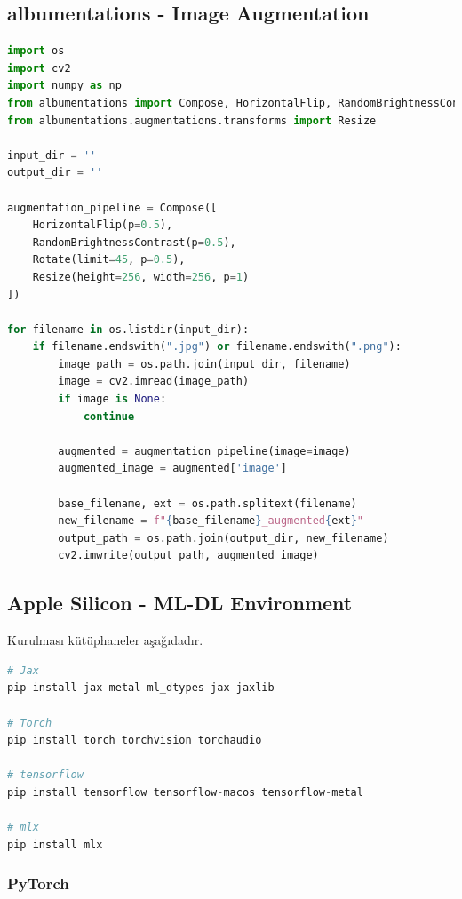 \newpage

\subsection{albumentations - Image Augmentation}
\begin{lstlisting}[language=Python]
import os
import cv2
import numpy as np
from albumentations import Compose, HorizontalFlip, RandomBrightnessContrast, Rotate
from albumentations.augmentations.transforms import Resize

input_dir = ''
output_dir = ''

augmentation_pipeline = Compose([
    HorizontalFlip(p=0.5),
    RandomBrightnessContrast(p=0.5),
    Rotate(limit=45, p=0.5),
    Resize(height=256, width=256, p=1)
])

for filename in os.listdir(input_dir):
    if filename.endswith(".jpg") or filename.endswith(".png"):
        image_path = os.path.join(input_dir, filename)
        image = cv2.imread(image_path)
        if image is None:
            continue

        augmented = augmentation_pipeline(image=image)
        augmented_image = augmented['image']

        base_filename, ext = os.path.splitext(filename)
        new_filename = f"{base_filename}_augmented{ext}"
        output_path = os.path.join(output_dir, new_filename)
        cv2.imwrite(output_path, augmented_image)
\end{lstlisting}

\subsection{Apple Silicon - ML-DL Environment}

Kurulması kütüphaneler aşağıdadır.

\begin{lstlisting}[language=Python]
# Jax
pip install jax-metal ml_dtypes jax jaxlib

# Torch
pip install torch torchvision torchaudio

# tensorflow
pip install tensorflow tensorflow-macos tensorflow-metal

# mlx 
pip install mlx
\end{lstlisting}

\subsubsection{PyTorch}

